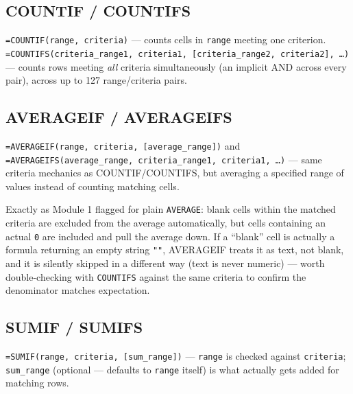 \documentclass[11pt,a4paper]{article}
\begin{document}
\subsection{COUNTIF / COUNTIFS}

\begin{formulasyntax}
\texttt{=COUNTIF(range, criteria)} --- counts cells in \texttt{range} meeting one criterion. \texttt{=COUNTIFS(criteria\_range1, criteria1, [criteria\_range2, criteria2], \ldots)} --- counts rows meeting \emph{all} criteria simultaneously (an implicit AND across every pair), across up to 127 range/criteria pairs.
\end{formulasyntax}

\subsection{AVERAGEIF / AVERAGEIFS}

\begin{formulasyntax}
\texttt{=AVERAGEIF(range, criteria, [average\_range])} and \texttt{=AVERAGEIFS(average\_range, criteria\_range1, criteria1, \ldots)} --- same criteria mechanics as COUNTIF/COUNTIFS, but averaging a specified range of values instead of counting matching cells.
\end{formulasyntax}

\begin{pitfall}
Exactly as Module 1 flagged for plain \texttt{AVERAGE}: blank cells within the matched criteria are excluded from the average automatically, but cells containing an actual \texttt{0} are included and pull the average down. If a ``blank'' cell is actually a formula returning an empty string \texttt{""}, AVERAGEIF treats it as text, not blank, and it is silently skipped in a different way (text is never numeric) --- worth double-checking with \texttt{COUNTIFS} against the same criteria to confirm the denominator matches expectation.
\end{pitfall}

\subsection{SUMIF / SUMIFS}

\begin{formulasyntax}[SUMIF]
\texttt{=SUMIF(range, criteria, [sum\_range])} --- \texttt{range} is checked against \texttt{criteria}; \texttt{sum\_range} (optional --- defaults to \texttt{range} itself) is what actually gets added for matching rows.
\end{formulasyntax}
\end{document}
